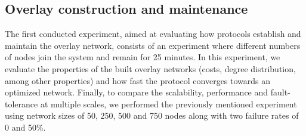 
\begin{table} \label{table:proto_test_params}
    \caption{Membership evaluation: protocol configuration parameters}
\end{table}

\subsection{Overlay construction and maintenance}

The first conducted experiment, aimed at evaluating how protocols establish and maintain the overlay network, consists of an experiment where different numbers of nodes join the system and remain for 25 minutes. In this experiment, we evaluate the properties of the built overlay networks (costs, degree distribution, among other properties) and how fast the protocol converges towards an optimized network. Finally, to compare the scalability, performance and fault-tolerance at multiple scales, we performed the previously mentioned experiment using network sizes of 50, 250, 500 and 750 nodes along with two failure rates of 0 and 50\%.

